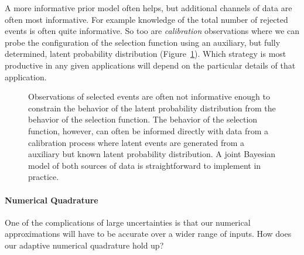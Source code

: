 \documentclass[
  letterpaper,
  DIV=11,
  numbers=noendperiod]{scrartcl}
\let\oldparagraph\paragraph
\renewcommand{\paragraph}[1]{\oldparagraph{#1}\mbox{}}
\begin{document}
A more informative prior model often helps, but additional channels of
data are often most informative. For example knowledge of the total
number of rejected events is often quite informative. So too are
\emph{calibration} observations where we can probe the configuration of
the selection function using an auxiliary, but fully determined, latent
probability distribution (Figure~\ref{fig-calibration}). Which strategy
is most productive in any given applications will depend on the
particular details of that application.

\begin{figure}


\caption{\label{fig-calibration}Observations of selected events are
often not informative enough to constrain the behavior of the latent
probability distribution from the behavior of the selection function.
The behavior of the selection function, however, can often be informed
directly with data from a calibration process where latent events are
generated from a auxiliary but known latent probability distribution. A
joint Bayesian model of both sources of data is straightforward to
implement in practice.}

\end{figure}%

\paragraph{Numerical Quadrature}\label{numerical-quadrature-2}

One of the complications of large uncertainties is that our numerical
approximations will have to be accurate over a wider range of inputs.
How does our adaptive numerical quadrature hold up?
\end{document}
